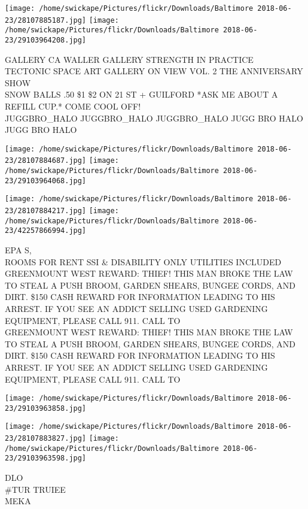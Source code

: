 \documentclass[10pt,letterpaper]{article}
\begin{document}
\texttt{[image: /home/swickape/Pictures/flickr/Downloads/Baltimore 2018-06-23/28107885187.jpg]}
\texttt{[image: /home/swickape/Pictures/flickr/Downloads/Baltimore 2018-06-23/29103964208.jpg]}

GALLERY CA WALLER GALLERY STRENGTH IN PRACTICE\\
TECTONIC SPACE ART GALLERY ON VIEW VOL. 2 THE ANNIVERSARY SHOW\\
SNOW BALLS .50 \$1 \$2 ON 21 ST + GUILFORD *ASK ME ABOUT A REFILL CUP.* COME COOL OFF!\\
JUGGBRO\_HALO JUGGBRO\_HALO JUGGBRO\_HALO JUGG BRO HALO JUGG BRO HALO
\pagebreak

\texttt{[image: /home/swickape/Pictures/flickr/Downloads/Baltimore 2018-06-23/28107884687.jpg]}
\texttt{[image: /home/swickape/Pictures/flickr/Downloads/Baltimore 2018-06-23/29103964068.jpg]}

\texttt{[image: /home/swickape/Pictures/flickr/Downloads/Baltimore 2018-06-23/28107884217.jpg]}
\texttt{[image: /home/swickape/Pictures/flickr/Downloads/Baltimore 2018-06-23/42257866994.jpg]}

EPA S,\\
ROOMS FOR RENT SSI \& DISABILITY ONLY UTILITIES INCLUDED\\
GREENMOUNT WEST REWARD: THIEF!  THIS MAN BROKE THE LAW TO STEAL A PUSH BROOM, GARDEN SHEARS, BUNGEE CORDS, AND DIRT.  \$150 CASH REWARD FOR INFORMATION LEADING TO HIS ARREST.  IF YOU SEE AN ADDICT SELLING USED GARDENING EQUIPMENT, PLEASE CALL 911.  CALL TO\\
GREENMOUNT WEST REWARD: THIEF!  THIS MAN BROKE THE LAW TO STEAL A PUSH BROOM, GARDEN SHEARS, BUNGEE CORDS, AND DIRT.  \$150 CASH REWARD FOR INFORMATION LEADING TO HIS ARREST.  IF YOU SEE AN ADDICT SELLING USED GARDENING EQUIPMENT, PLEASE CALL 911.  CALL TO
\pagebreak

\texttt{[image: /home/swickape/Pictures/flickr/Downloads/Baltimore 2018-06-23/29103963858.jpg]}

\vspace{0.25in}
\texttt{[image: /home/swickape/Pictures/flickr/Downloads/Baltimore 2018-06-23/28107883827.jpg]}
\texttt{[image: /home/swickape/Pictures/flickr/Downloads/Baltimore 2018-06-23/29103963598.jpg]}

DLO\\
\#TUR TRUIEE\\
MEKA
\pagebreak
\end{document}
